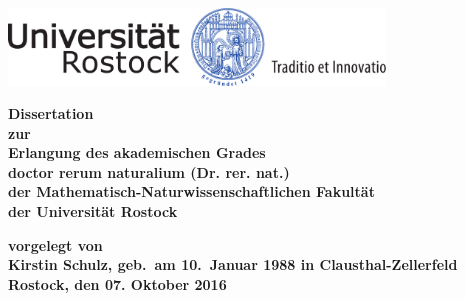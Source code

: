 
\thispagestyle{empty}
\begin{center}
\vspace*{-2cm}
\includegraphics[width=0.75\textwidth]{unilogo-siegel-farbe}\\
\vspace*{3cm}
    {\titlefont \huge \onehalfspacing
	\thetitle 
    \par}%
   \vfill
    {\normalfont\normalcolor\bfseries
	\large
	Dissertation \\
	\large
	zur\\
	Erlangung des akademischen Grades\\
	doctor rerum naturalium (Dr. rer. nat.)\\ 
	der Mathematisch-Naturwissenschaftlichen Fakultät\\
	der Universität Rostock
    \par}%
\end{center}\par
\vspace*{2.5cm}
\noindent\begin{minipage}[b]{\textwidth}
{\bf
  \noindent vorgelegt von\\
  Kirstin Schulz, geb.~am 10.~Januar 1988 in 
Clausthal-Zellerfeld\\



  \noindent Rostock, den 07. Oktober 2016
  }
\end{minipage}


